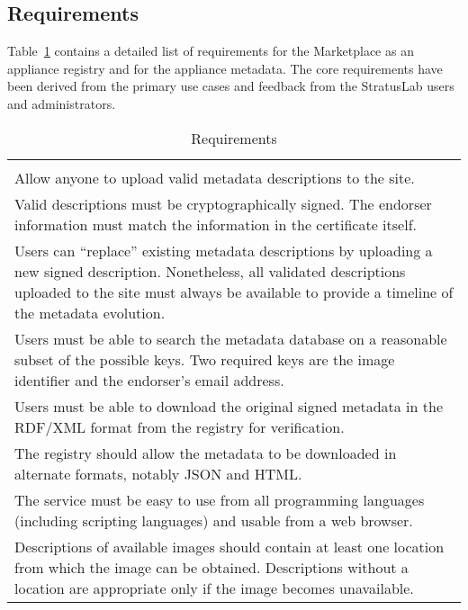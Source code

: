 \subsection{Requirements}

Table~\ref{tab:requirements} contains a detailed list of requirements
for the Marketplace as an appliance registry and for the appliance
metadata.  The core requirements have been derived from the primary
use cases and feedback from the StratusLab users and administrators.

\begin{table}
\caption{Requirements}
\label{tab:requirements}
\begin{center}
\begin{tabular}{p{}}
\hline\hline

\\ Allow anyone to upload valid metadata descriptions to the site.

\\ Valid descriptions must be cryptographically signed.  The endorser
information must match the information in the certificate itself.

\\ Users can ``replace'' existing metadata descriptions by
  uploading a new signed description.  Nonetheless, all validated
  descriptions uploaded to the site must always be available to
  provide a timeline of the metadata evolution.

\\ Users must be able to search the metadata database on a
  reasonable subset of the possible keys.  Two required keys are the
  image identifier and the endorser's email address.

\\ Users must be able to download the original signed metadata in
  the RDF/XML format from the registry for verification.

\\ The registry should allow the metadata to be downloaded in
  alternate formats, notably JSON and HTML.

\\ The service must be easy to use from all programming languages
  (including scripting languages) and usable from a web browser.


\\
  Descriptions of available images should contain at least one
  location from which the image can be obtained.  Descriptions without
  a location are appropriate only if the image becomes unavailable.


\end{tabular}
\end{center}
\end{table}
